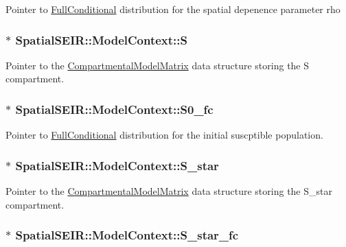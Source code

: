 Pointer to \hyperlink{classSpatialSEIR_1_1FullConditional}{Full\-Conditional} distribution for the spatial depenence parameter rho \hypertarget{classSpatialSEIR_1_1ModelContext_afa683f7f79821d957107d301dfe392c1}{
\subsubsection[{S}]{$\ast$ Spatial\-S\-E\-I\-R\-::\-Model\-Context\-::\-S}}\label{classSpatialSEIR_1_1ModelContext_afa683f7f79821d957107d301dfe392c1}
Pointer to the \hyperlink{classSpatialSEIR_1_1CompartmentalModelMatrix}{Compartmental\-Model\-Matrix} data structure storing the S compartment. \hypertarget{classSpatialSEIR_1_1ModelContext_ab45d23e96fb44d1758dc73ea1a11629f}{
\subsubsection[{S0\-\_\-fc}]{$\ast$ Spatial\-S\-E\-I\-R\-::\-Model\-Context\-::\-S0\-\_\-fc}}\label{classSpatialSEIR_1_1ModelContext_ab45d23e96fb44d1758dc73ea1a11629f}
Pointer to \hyperlink{classSpatialSEIR_1_1FullConditional}{Full\-Conditional} distribution for the initial suscptible population. \hypertarget{classSpatialSEIR_1_1ModelContext_a6fce6827d821ab06e57abe08e6f6c4cb}{
\subsubsection[{S\-\_\-star}]{$\ast$ Spatial\-S\-E\-I\-R\-::\-Model\-Context\-::\-S\-\_\-star}}\label{classSpatialSEIR_1_1ModelContext_a6fce6827d821ab06e57abe08e6f6c4cb}
Pointer to the \hyperlink{classSpatialSEIR_1_1CompartmentalModelMatrix}{Compartmental\-Model\-Matrix} data structure storing the S\-\_\-star compartment. \hypertarget{classSpatialSEIR_1_1ModelContext_adeacc82667f794bca82d60daeb03cd9d}{
\subsubsection[{S\-\_\-star\-\_\-fc}]{$\ast$ Spatial\-S\-E\-I\-R\-::\-Model\-Context\-::\-S\-\_\-star\-\_\-fc}}\label{classSpatialSEIR_1_1ModelContext_adeacc82667f794bca82d60daeb03cd9d}
